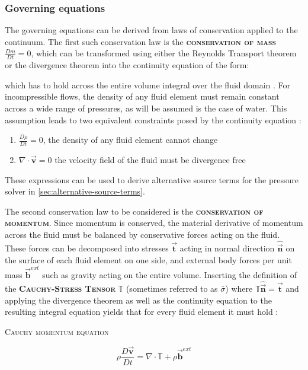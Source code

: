 \documentclass[oneside, a4paper]{book}
\newcommand\emphasis[1]{{\scshape\bfseries#1}}
\newcommand{\equationnamed}[2]{%
  \setlength{\fboxsep}{2pt} %
  \setlength{\fboxrule}{0.01pt}
  \begin{center}
    \begin{minipage}{\textwidth}
      \begin{center}\textsc{#1}\end{center}
      #2
    \end{minipage}
  \end{center}
}
\newcommand{\equationnamedbox}[2]{%
  \setlength{\fboxsep}{5pt} %
  \setlength{\fboxrule}{0.01pt}
  \begin{center}
    \fbox{
      \begin{minipage}{0.4\textwidth}
        \begin{center}\emphasis{#1}\end{center}
        #2
      \end{minipage}
    }
  \end{center}
}
\newcommand\vek[1]{\vec{\bm{#1}}}
\newcommand\mat[1]{{\mathds{#1}}}
\newcommand\br[1]{\left(#1\right)}
\newcommand\divergence{{\nabla\cdot}}
\begin{document}
    \subsubsection{Governing equations}
    The governing equations can be derived from laws of conservation applied to the continuum. The first such conservation law is the \emphasis{conservation of mass} $\frac{Dm}{Dt}=0$, which can be transformed using either the Reynolds Transport theorem or the divergence theorem \autocite{labcourse} into the continuity equation of the form:
    \equationnamedbox{Continuity Equation}{
      \begin{equation}\label{eq:continuity}
        \frac{D\rho}{Dt} +\rho\br{\divergence \vek{v}} = 0
      \end{equation}
    }
    which has to hold across the entire volume integral over the fluid domain \autocite{anderson}. For incompressible flows, the density of any fluid element must remain constant across a wide range of pressures, as will be assumed is the case of water. This assumption leads to two equivalent constraints posed by the continuity equation \autocite{continuum-intro}: 
    \begin{enumerate}
      \item $\frac{D\rho}{Dt}=0$, the density of any fluid element cannot change 
      \item $\divergence\vek{v}=0$ the velocity field of the fluid must be divergence free
    \end{enumerate}
    These expressions can be used to derive alternative source terms for the pressure solver in \autoref{sec:alternative-source-terms}.


    The second conservation law to be considered is the \emphasis{conservation of momentum}. Since momentum is conserved, the material derivative of momentum across the fluid must be balanced by conservative forces acting on the fluid. These forces can be decomposed into stresses $\vek{t}$ acting in normal direction $\hat{\vek{n}}$ on the surface of each fluid element on one side, and external body forces per unit mass $\vek{b}^{ext}$ such as gravity acting on the entire volume. Inserting the definition of the \emphasis{Cauchy-Stress Tensor} $\mat{T}$ (sometimes referred to as $\bar\sigma$) where $\mat{T}\hat{\vek{n}}=\vek{t}$ and applying the divergence theorem as well as the continuity equation to the resulting integral equation yields that for every fluid element it must hold \autocite{continuum-intro}:
    \equationnamed{Cauchy momentum equation}{
      \begin{equation}
        \rho\frac{D\vek{v}}{Dt} = \divergence\mat{T} + \rho\vek{b}^{ext}
      \end{equation}
      }
\end{document}
